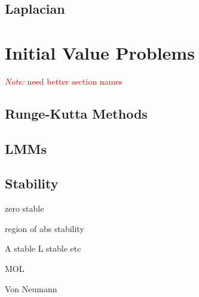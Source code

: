 \documentclass[12pt]{article}
\newcommand{\note}[1]{\textcolor{red}{\textit{Note:} #1}}
\begin{document}
\subsection{Laplacian}


\pagebreak
\section{Initial Value Problems}
\note{need better section names}

\subsection{Runge-Kutta Methods}


\subsection{LMMs}


\subsection{Stability}


zero stable

region of abs stability

A stable L stable etc

MOL

Von Neumann
\end{document}
